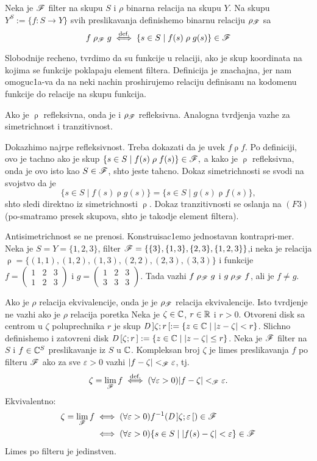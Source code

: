 \documentclass[../main_og.tex]{subfiles}
\begin{document}
    {\de Neka je $\mathscr{F}$ filter na skupu $S$ i $\rho$ binarna relacija na skupu $Y$. Na skupu $Y^S:=\{f:S\to Y\}$ svih preslikavanja definishemo binarnu relaciju $\rho_{\mathscr{F}}$ sa $$f\mathrel{\rho_{\mathscr{F}}} g \overset{\text{def.}}{\iff} \{s \in S \mid f(s) \mathrel{\rho} g(s)\}\in \mathscr{F}$$}

    Slobodnije recheno, tvrdimo da su funkcije u relaciji, ako je skup koordinata na kojima se funkcije poklapaju element filtera. Definicija je znachajna, jer nam omoguc1a-va da na neki nachin proshirujemo relaciju definisanu na kodomenu funkcije do relacije na skupu funkcija.

    {\tvr Ako je $\mathrel{\rho}$ refleksivna, onda je i $\mathrel{\rho_{\mathscr{F}}}$ refleksivna. Analogna tvrdjenja vazhe za simetrichnost i tranzitivnost.}

    \dok Dokazhimo najrpe refleksivnost. Treba dokazati da je uvek $f\mathrel{\rho}f$. Po definiciji, ovo je tachno ako je skup $\{s\in S\mid f(s)\mathrel{\rho}f(s)\} \in \mathscr{F},$ a kako je $\mathrel{\rho}$ refleksivna, onda je ovo isto kao $S \in \mathscr{F}$, shto jeste tahcno. Dokaz simetrichnosti se svodi na svojstvo da je $$\{s \in S\mid  f(s) \mathrel{\rho} g(s)\}=\{s \in S\mid  g(s) \mathrel{\rho} f(s)\},$$ shto sledi direktno iz simetrichnosti $\mathrel{\rho}$. Dokaz tranzitivnosti se oslanja na $(F3)$ (po-smatramo presek skupova, shto je takodje element filtera).

    \nap Antisimetrichnost se ne prenosi. Konstruisac1emo jednostavan kontrapri-mer. Neka je $S=Y=\{1,2,3\}$, filter $\mathscr{F}=\{\{3\},\{1,3\},\{2,3\},\{1,2,3\}\}$,i neka je relacija $\mathrel{\rho}=\{(1,1),(1,2),(1,3),(2,2),(2,3),(3,3)\}$ i funkcije $f=\begin{pmatrix}
1 & 2 & 3\\
1 & 2 & 3
\end{pmatrix}$ i $g=\begin{pmatrix}
1 & 2 & 3\\
3 & 3 & 3
\end{pmatrix}$. Tada vazhi $f\mathrel{\rho_{\mathscr{F}}}g$ i $g\mathrel{\rho_{\mathscr{F}}}f$, ali je $f\neq g$.

    {\posl Ako je $\rho$ relacija ekvivalencije, onda je je $\rho_{\mathscr{F}}$ relacija ekvivalencije. Isto tvrdjenje ne vazhi ako je $\rho$ relacija poretka}
    {\de Neka je $\zeta \in \mathbb{C}$, $r \in \mathbb{R}$ i $r>0$. Otvoreni disk sa centrom u $\zeta$ poluprechnika $r$ je skup $\mathit{D}\,]\zeta;r\,[:=\{z\in \mathbb{C}\mid |z-\zeta|<r\}$. Slichno definishemo i zatovreni disk $\mathit{D}\,[\zeta;r\,]:=\{z\in \mathbb{C}\mid |z-\zeta|\leq r\}$. }
    {\de Neka je $\mathscr{F}$ filter na $S$ i $f\in \mathbb{C}^S$ preslikavanje iz $S$ u $\mathbb{C}$. Kompleksan broj $\zeta$ je limes preslikavanja $f$ po filteru $\mathscr{F}$ ako za sve $\varepsilon>0$ vazhi $|f-\zeta|<_{\mathscr{F}} \varepsilon$, tj. \[\zeta= \lim_{\mathscr{F}} f \overset{\text{def.}}{\iff} (\forall \varepsilon >0)|f-\zeta|<_{\mathscr{F}}\varepsilon.\]}
    Ekvivalentno: 
    \begin{align*}\zeta=\lim_{\mathscr{F}} f &\iff (\forall \varepsilon>0) f^{-1}(\mathit{D}\,]\zeta;\varepsilon\,[)\in \mathscr{F}\\
    &\iff (\forall \varepsilon>0) \{s\in S\mid|f(s)-\zeta|<\varepsilon\}\in \mathscr{F}
    \end{align*}
    {\tvr Limes po filteru je jedinstven.}
\end{document}
